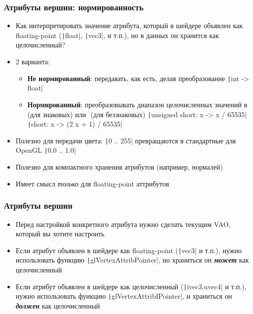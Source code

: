 \documentclass[10pt]{beamer}
\begin{document}
\begin{frame}[fragile]
\frametitle{Атрибуты вершин: нормированность}
\begin{itemize}
\item Как интерпретировать значение атрибута, который в шейдере объявлен как floating-point (\texttt|float|, \texttt|vec3|, и т.п.), но в данных он хранится как целочисленный?
\pause
\item 2 варианта:
\begin{itemize}
\item \textbf{Не нормированный}: передавать, как есть, делая преобразование \texttt|int -> float|
\pause
\item \textbf{Нормированный}: преобразовывать диапазон целочисленных значений в \begin{math}[-1, 1]\end{math} (для знаковых) или \begin{math}[0, 1]\end{math} (для беззнаковых)
\newline
\texttt|unsigned short: x -> x / 65535|
\newline
\texttt|short: x -> (2 x + 1) / 65535|
\end{itemize}
\pause
\item Полезно для передачи цвета: \texttt|0 .. 255| превращаются в стандартные для OpenGL \texttt|0.0 .. 1.0|
\pause
\item Полезно для компактного хранения атрибутов (например, нормалей)
\pause
\item Имеет смысл \textit{только} для floating-point аттрибутов
\end{itemize}
\end{frame}

\begin{frame}[fragile]
\frametitle{Атрибуты вершин}
\begin{itemize}
\item Перед настройкой конкретного атрибута нужно сделать текущим VAO, который вы хотите настроить
\pause
\item Если атрибут объявлен в шейдере как floating-point (\texttt|vec3| и т.п.), нужно использовать функцию \texttt|glVertexAttribPointer|, но храниться он \textbf{\textit{может}} как целочисленный
\pause
\item Если атрибут объявлен в шейдере как целочисленный (\texttt|ivec3,uvec4| и т.п.), нужно использовать функцию \texttt|glVertexAttribIPointer|, и храниться он \textbf{\textit{должен}} как целочисленный
\end{itemize}
\end{frame}
\end{document}
